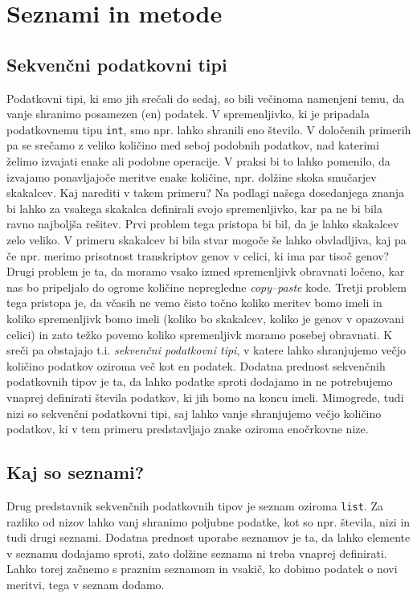 \chapter{Seznami in metode}

\section{Sekvenčni podatkovni tipi}

Podatkovni tipi, ki smo jih srečali do sedaj, so bili večinoma namenjeni temu, da vanje shranimo posamezen (en) podatek. V spremenljivko, ki je pripadala podatkovnemu tipu \texttt{int}, smo npr. lahko shranili eno število. V določenih primerih pa se srečamo z veliko količino med seboj podobnih podatkov, nad katerimi želimo izvajati enake ali podobne operacije. V praksi bi to lahko pomenilo, da izvajamo ponavljajoče meritve enake količine, npr. dolžine skoka smučarjev skakalcev. Kaj narediti v takem primeru? Na podlagi našega dosedanjega znanja bi lahko za vsakega skakalca definirali svojo spremenljivko, kar pa ne bi bila ravno najboljša rešitev. Prvi problem tega pristopa bi bil, da je lahko skakalcev zelo veliko. V primeru skakalcev bi bila stvar mogoče še lahko obvladljiva, kaj pa če npr. merimo prisotnost transkriptov genov v celici, ki ima par tisoč genov? Drugi problem je ta, da moramo vsako izmed spremenljivk obravnati ločeno, kar nas bo pripeljalo do ogrome količine nepregledne \emph{copy--paste} kode. Tretji problem tega pristopa je, da včasih ne vemo čisto točno koliko meritev bomo imeli in koliko spremenljivk bomo imeli (koliko bo skakalcev, koliko je genov v opazovani celici) in zato težko povemo koliko spremenljivk moramo posebej obravnati. K sreči pa obstajajo t.i. \emph{sekvenčni podatkovni tipi}, v katere lahko shranjujemo večjo količino podatkov oziroma več kot en podatek. Dodatna prednost sekvenčnih podatkovnih tipov je ta, da lahko podatke sproti dodajamo in ne potrebujemo vnaprej definirati števila podatkov, ki jih bomo na koncu imeli. Mimogrede, tudi nizi so sekvenčni podatkovni tipi, saj lahko vanje shranjujemo večjo količino podatkov, ki v tem primeru predstavljajo znake oziroma enočrkovne nize. 

\section{Kaj so seznami?}

Drug predstavnik sekvenčnih podatkovnih tipov je seznam oziroma \texttt{list}. Za razliko od nizov lahko vanj shranimo poljubne podatke, kot so npr. števila, nizi in tudi drugi seznami. Dodatna prednost uporabe seznamov je ta, da lahko elemente v seznamu dodajamo sproti, zato dolžine seznama ni treba vnaprej definirati. Lahko torej začnemo s praznim seznamom in vsakič, ko dobimo podatek o novi meritvi, tega v seznam dodamo. 

